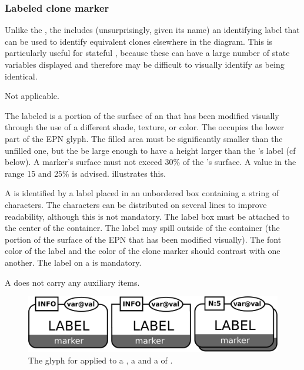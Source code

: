 \subsubsection{Labeled clone marker}

Unlike the , the  includes (unsurprisingly, given its name) an identifying label that can be used to identify equivalent clones elsewhere in the diagram.  This is particularly useful for stateful , because these can have a large number of state variables displayed and therefore may be difficult to visually identify as being identical.

\begin{glyphDescription}

\glyphSboTerm Not applicable.

\glyphContainer The labeled  is a portion of the surface of an  that has been modified visually through the use of a different shade, texture, or color.  The  occupies the lower part of the EPN glyph. The filled area must be significantly smaller than the unfilled one, but the be large enough to have a height larger than the 's label (cf below). A marker's surface must not exceed 30\% of the 's surface. A value in the range 15 and 25\% is advised.  illustrates this.   

\glyphLabel A  is identified by a label placed in an unbordered box containing a string of characters.  The characters can be distributed on several lines to improve readability, although this is not mandatory.  The label box must be attached to the center of the container.  The label may spill outside of the container (the portion of the surface of the EPN that has been modified visually).  The font color of the label and the color of the clone marker should contrast with one another.  The label on a  is mandatory.

\glyphAux A  does not carry any auxiliary items.

\end{glyphDescription}

\begin{figure}[H]
  \centering
  \includegraphics[scale = 0.3]{images/labeledCloneMarker}
  \caption{The \PD glyph for  applied to a , a  and a  of .}
  \label{fig:labeledCloneMarker}
\end{figure}


